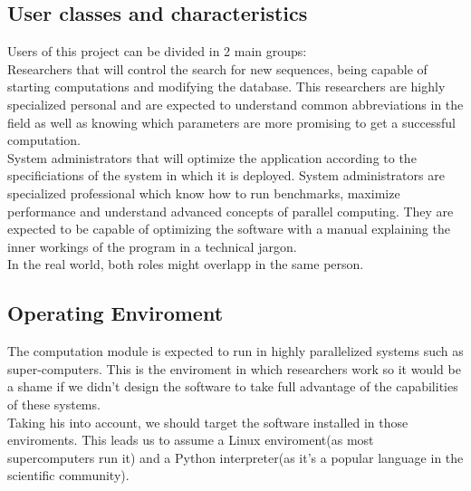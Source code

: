   \subsection{User classes and characteristics}

  Users of this project can be divided in 2 main groups:\\

  Researchers that will control the search for new sequences, being capable of
  starting computations and modifying the database. This researchers are highly
  specialized personal and are expected to understand common abbreviations in
  the field as well as knowing which parameters are more promising to get a
  successful computation.\\

  System administrators that will optimize the application according to the
  specificiations of the system in which it is deployed. System administrators
  are specialized professional which know how to run benchmarks, maximize
  performance and understand advanced concepts of parallel computing. They are
  expected to be capable of optimizing the software with a manual explaining
  the inner workings of the program in a technical jargon.\\

  In the real world, both roles might overlapp in the same person.\\

  \subsection{Operating Enviroment}

  The computation module is expected to run in highly parallelized systems such
  as super-computers. This is the enviroment in which researchers work so it
  would be a shame if we didn't design the software to take full advantage of
  the capabilities of these systems.\\

  Taking his into account, we should target the software installed in those
  enviroments. This leads us to assume a Linux enviroment(as most supercomputers
  run it) and a Python interpreter(as it's a popular language in the scientific
  community).\\

